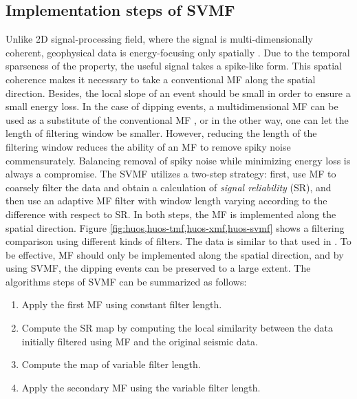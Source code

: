 \subsection{Implementation steps of SVMF}
Unlike 2D signal-processing field, where the signal is multi-dimensionally coherent, geophysical data is energy-focusing only spatially . Due to the temporal sparseness of the property, the useful signal takes a spike-like form. This spatial coherence makes it necessary to take a conventional MF along the spatial direction. Besides, the local slope of an event should be small in order to ensure a small energy loss. In the case of dipping events, a multidimensional MF can be used as a substitute of the conventional MF \cite[]{mediandeblend}, or in the other way, one can let the length of filtering window be smaller. However, reducing the length of the filtering window reduces the ability of an MF to remove spiky noise commensurately. Balancing removal of spiky noise while minimizing energy loss is always a compromise. The SVMF utilizes a two-step strategy: first, use MF to coarsely filter the data and obtain a calculation of \emph{signal reliability} (SR), and then use an adaptive MF filter with window length varying according to the difference with respect to SR.  In both steps, the MF is implemented along the spatial direction. Figure \ref{fig:huos,huos-tmf,huos-xmf,huos-svmf} shows a filtering comparison using different kinds of filters. The data is similar to that used in \cite{mediandeblend}. To be effective, MF should only be implemented along the spatial direction, and by using SVMF, the dipping events can be preserved to a large extent. The algorithms steps of SVMF can be summarized as follows:
\begin{enumerate}
\item Apply the first MF using constant filter length.
\item Compute the SR map by computing the local similarity between the data initially filtered using MF and the original seismic data.
\item Compute the map of variable filter length.
\item Apply the secondary MF using the variable filter length.
\end{enumerate}



